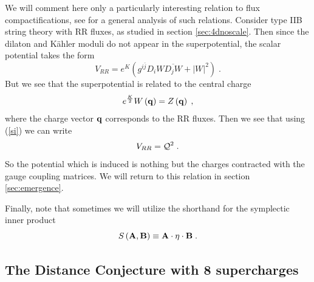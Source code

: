 \documentclass[11pt,a4paper]{article}
\numberwithin{equation}{section}
\numberwithin{table}{section}\setlength{\multlinegap}{25pt}
\newcommand{\be}{\begin{equation}}
\newcommand{\ee}{\end{equation}}
\begin{document}
We will comment here only a particularly interesting relation to flux compactifications, see \cite{Louis:2002ny} for a general analysis of such relations. Consider type IIB string theory with RR fluxes, as studied in section \ref{sec:4dnoscale}. Then since the dilaton and K{\"a}hler moduli do not appear in the superpotential, the scalar potential takes the form
\be
V_{RR} = e^K \left( g^{i\bar{j}} D_i W \overline{D_j W} + \left| W \right|^2 \right) \;.
\ee 
But we see that the superpotential is related to the central charge 
\be
e^{\frac{K}{2}} W\left( {\bf q}\right) = Z \left( {\bf q}\right)  \;,
\ee
where the charge vector ${\bf q}$ corresponds to the RR fluxes. Then we see that using (\ref{si}) we can write
\be
V_{RR} = {\cal Q}^2 \;.
\label{VRRQ2}
\ee
So the potential which is induced is nothing but the charges contracted with the gauge coupling matrices. We will return to this relation in section \ref{sec:emergence}. 

Finally, note that sometimes we will utilize the shorthand for the symplectic inner product
\be
S\left({\bf A}, {\bf B} \right) \equiv {\bf A} \cdot \eta \cdot {\bf B} \;.
\label{Sipdef}
\ee

\subsection{The Distance Conjecture with 8 supercharges}
\label{sec:dcwith8}
\end{document}
